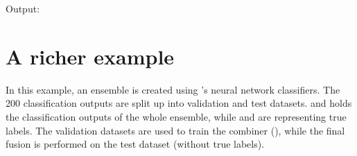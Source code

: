\documentclass[letterpaper,10pt,english]{sphinxmanual}
\begin{document}
\begin{sphinxVerbatim}[commandchars=\\\{\}]
  

\end{sphinxVerbatim}

\sphinxAtStartPar
Output:

\begin{sphinxVerbatim}[commandchars=\\\{\}]
\PYG{o}{[}\PYG{o}{[}  \PYG{o}{]}
 \PYG{o}{[}  \PYG{o}{]}
 \PYG{o}{[}  \PYG{o}{]}\PYG{o}{]}
\end{sphinxVerbatim}


\section{A richer example}
\label{\detokenize{usage_and_examples:a-richer-example}}
\sphinxAtStartPar
In this example, an ensemble is created using ’s neural network classifiers.
The 200 classification outputs are split up into validation and test datasets.
 and  holds the classification outputs of the whole ensemble, while
 and  are representing true labels.
The validation datasets are used to train the  combiner ({\hyperref[\detokenize{pusion.core.dempster_shafer_combiner:ds-cref}]{}}), while the
final fusion is performed on the test dataset (without true labels).
\end{document}
